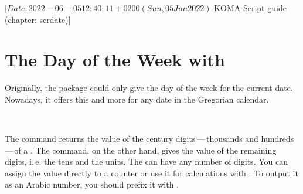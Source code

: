 %
%
%
%
%
%
%

                 [$Date: 2022-06-05 12:40:11 +0200 (Sun, 05 Jun 2022) $
                  KOMA-Script guide (chapter: scrdate)]

\chapter{The Day of the Week with }
\BeginIndexGroup
{}

Originally, the  package could only give the day of the week
for the current date. Nowadays, it offers this and more for any date in the
Gregorian calendar.

\begin{Declaration}
  \\%
\end{Declaration}%
The  command returns
the value of the century digits\,---\,thousands and hundreds\,---\,of a
. The  command, on the other hand, gives the
value of the remaining digits, i.\,e. the tens and the units. The
 can have any number of digits. You can assign the value directly
to a counter or use it for calculations with
. To output it as an
Arabic number, you should prefix it with .

